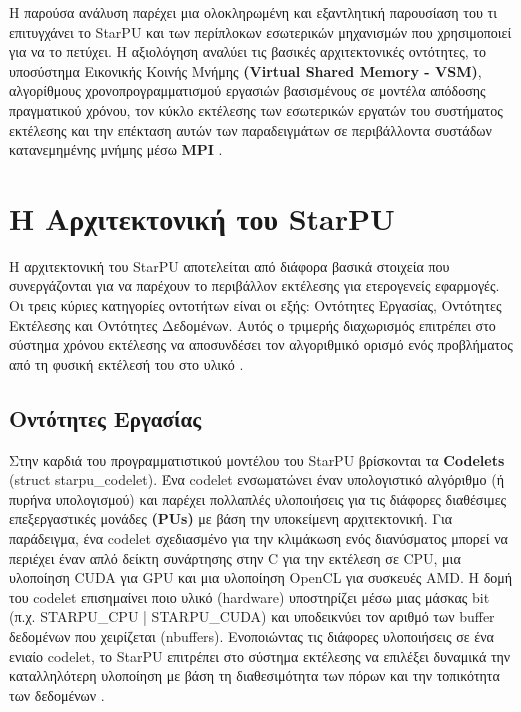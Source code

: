 Η παρούσα ανάλυση παρέχει μια ολοκληρωμένη και εξαντλητική παρουσίαση του τι επιτυγχάνει το StarPU και των περίπλοκων εσωτερικών μηχανισμών που χρησιμοποιεί για να το πετύχει. Η αξιολόγηση αναλύει τις βασικές αρχιτεκτονικές οντότητες, το υποσύστημα Εικονικής Κοινής Μνήμης \textbf{(Virtual Shared Memory - VSM)}, αλγορίθμους χρονοπρογραμματισμού εργασιών βασισμένους σε μοντέλα απόδοσης πραγματικού χρόνου, τον κύκλο εκτέλεσης των εσωτερικών εργατών του συστήματος εκτέλεσης και την επέκταση αυτών των παραδειγμάτων σε περιβάλλοντα συστάδων κατανεμημένης μνήμης μέσω \textbf{MPI} \cite{augonnet:inria-00467677, augonnet2010data}. 

\section{Η Αρχιτεκτονική του StarPU}

Η αρχιτεκτονική του StarPU αποτελείται από διάφορα βασικά στοιχεία που συνεργάζονται για να παρέχουν το περιβάλλον εκτέλεσης για ετερογενείς εφαρμογές. Οι τρεις κύριες κατηγορίες οντοτήτων είναι οι εξής: Οντότητες Εργασίας, Οντότητες Εκτέλεσης και Οντότητες Δεδομένων. Αυτός ο τριμερής διαχωρισμός επιτρέπει στο σύστημα χρόνου εκτέλεσης να αποσυνδέσει τον αλγοριθμικό ορισμό ενός προβλήματος από τη φυσική εκτέλεσή του στο υλικό \cite{starpu_dev_manual}.

\subsection{Οντότητες Εργασίας}

Στην καρδιά του προγραμματιστικού μοντέλου του StarPU βρίσκονται τα \textbf{Codelets} (struct starpu\_codelet). Ένα codelet ενσωματώνει έναν υπολογιστικό αλγόριθμο (ή πυρήνα υπολογισμού) και παρέχει πολλαπλές υλοποιήσεις για τις διάφορες διαθέσιμες επεξεργαστικές μονάδες \textbf{(PUs)} με βάση την υποκείμενη αρχιτεκτονική. Για παράδειγμα, ένα codelet σχεδιασμένο για την κλιμάκωση ενός διανύσματος μπορεί να περιέχει έναν απλό δείκτη συνάρτησης στην C για την εκτέλεση σε CPU, μια υλοποίηση CUDA για GPU και μια υλοποίηση OpenCL για συσκευές AMD. Η δομή του codelet επισημαίνει ποιο υλικό (hardware) υποστηρίζει μέσω μιας μάσκας bit (π.χ. STARPU\_CPU | STARPU\_CUDA) και υποδεικνύει τον αριθμό των buffer δεδομένων που χειρίζεται (nbuffers). Ενοποιώντας τις διάφορες υλοποιήσεις σε ένα ενιαίο codelet, το StarPU επιτρέπει στο σύστημα εκτέλεσης να επιλέξει δυναμικά την καταλληλότερη υλοποίηση με βάση τη διαθεσιμότητα των πόρων και την τοπικότητα των δεδομένων \cite{starpu2025handbook, starpu_dev_manual, starpu_website}.

